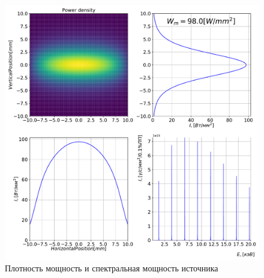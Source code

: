 \documentclass[14pt,a4paper]{extarticle}
\numberwithin{equation}{section}
\begin{document}
	\begin{figure}[htbp]
	\centering  
	\begin{minipage}{1.\textwidth}
		\centering  
		\includegraphics[width=\textwidth]{pic/power_dens.pdf}
		\caption{Плотность мощность и спектральная мощность источника}
		\label{fig:spec}
	\end{minipage}     
	\end{figure}

	
\end{document}
